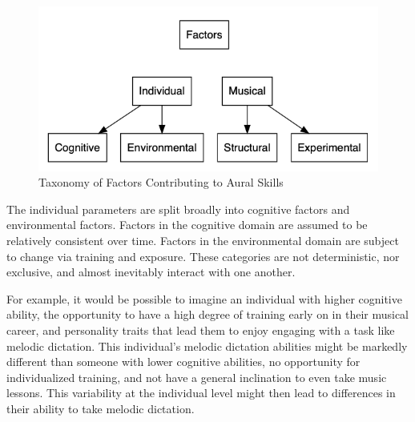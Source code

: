 \documentclass[12pt,]{book}
\begin{document}
\begin{figure}

{\centering \includegraphics[width=1\linewidth]{img/taxonomy} 

}

\caption{Taxonomy of Factors Contributing to Aural Skills}\label{fig:taxonomy}
\end{figure}

The individual parameters are split broadly into cognitive factors and environmental factors.
Factors in the cognitive domain are assumed to be relatively consistent over time.
Factors in the environmental domain are subject to change via training and exposure.
These categories are not deterministic, nor exclusive, and almost inevitably interact with one another.

For example, it would be possible to imagine an individual with higher cognitive ability, the opportunity to have a high degree of training early on in their musical career, and personality traits that lead them to enjoy engaging with a task like melodic dictation.
This individual's melodic dictation abilities might be markedly different than someone with lower cognitive abilities, no opportunity for individualized training, and not have a general inclination to even take music lessons.
This variability at the individual level might then lead to differences in their ability to take melodic dictation.
\end{document}
